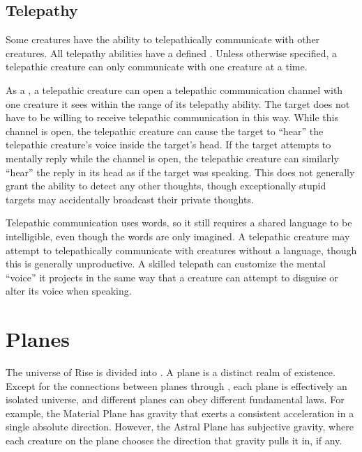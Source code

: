     \subsection{Telepathy}\label{Telepathy}
        Some creatures have the ability to telepathically communicate with other creatures.
        All telepathy abilities have a defined .
        Unless otherwise specified, a telepathic creature can only communicate with one creature at a time.

        As a , a telepathic creature can open a telepathic communication channel with one creature it sees within the range of its telepathy ability.
        The target does not have to be willing to receive telepathic communication in this way.
        While this channel is open, the telepathic creature can cause the target to ``hear'' the telepathic creature's voice inside the target's head.
        If the target attempts to mentally reply while the channel is open, the telepathic creature can similarly ``hear'' the reply in its head as if the target was speaking.
        This does not generally grant the ability to detect any other thoughts, though exceptionally stupid targets may accidentally broadcast their private thoughts.

        Telepathic communication uses words, so it still requires a shared language to be intelligible, even though the words are only imagined.
        A telepathic creature may attempt to telepathically communicate with creatures without a language, though this is generally unproductive.
        A skilled telepath can customize the mental ``voice'' it projects in the same way that a creature can attempt to disguise or alter its voice when speaking.

\section{Planes}\label{Planes}
    The universe of Rise is divided into .
    A plane is a distinct realm of existence.
    Except for the connections between planes through , each plane is effectively an isolated universe, and different planes can obey different fundamental laws.
    For example, the Material Plane has gravity that exerts a consistent acceleration in a single absolute direction.
    However, the Astral Plane has subjective gravity, where each creature on the plane chooses the direction that gravity pulls it in, if any.

